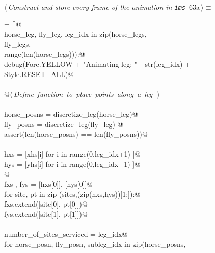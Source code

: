 \documentclass[11.5pt]{report}
\begin{document}
\begin{flushleft} \small
\begin{minipage}{\linewidth}\label{scrap95}\raggedright\small
{} $\langle\,${\itshape Construct and store every frame of the animation in \verb|ims|}\nobreak\ {\footnotesize {63a}}$\,\rangle\equiv$
\vspace{-1ex}
\begin{list}{}{} \item
\mbox{}\verb@ims = []@\\
\mbox{}\verb@for horse_leg, fly_leg, leg_idx in zip(horse_legs, \@\\
\mbox{}\verb@                                       fly_legs,   \@\\
\mbox{}\verb@                                       range(len(horse_legs))):@\\
\mbox{}\verb@     debug(Fore.YELLOW + "Animating leg: "+ str(leg_idx) + Style.RESET_ALL)@\\
\mbox{}\verb@@\\
\mbox{}\verb@     @\hbox{$\langle\,${\itshape Define function to place points along a leg}\nobreak\ {\footnotesize {}}$\,\rangle$}\verb@@\\
\mbox{}\verb@@\\
\mbox{}\verb@     horse_posns = discretize_leg(horse_leg)@\\
\mbox{}\verb@     fly_posns   = discretize_leg(fly_leg) @\\
\mbox{}\verb@     assert(len(horse_posns) == len(fly_posns))@\\
\mbox{}\verb@@\\
\mbox{}\verb@     hxs = [xhs[i] for i in range(0,leg_idx+1) ]@\\
\mbox{}\verb@     hys = [yhs[i] for i in range(0,leg_idx+1) ]@\\
\mbox{}\verb@           @\\
\mbox{}\verb@     fxs , fys = [hxs[0]], [hys[0]]@\\
\mbox{}\verb@     for site, pt in zip (sites,(zip(hxs,hys))[1:]):@\\
\mbox{}\verb@          fxs.extend([site[0], pt[0]])@\\
\mbox{}\verb@          fys.extend([site[1], pt[1]])@\\
\mbox{}\verb@@\\
\mbox{}\verb@     number_of_sites_serviced = leg_idx@\\
\mbox{}\verb@     for horse_posn, fly_posn, subleg_idx in zip(horse_posns, \@\\

\end{list}
\end{minipage}
\end{flushleft}
\end{document}
